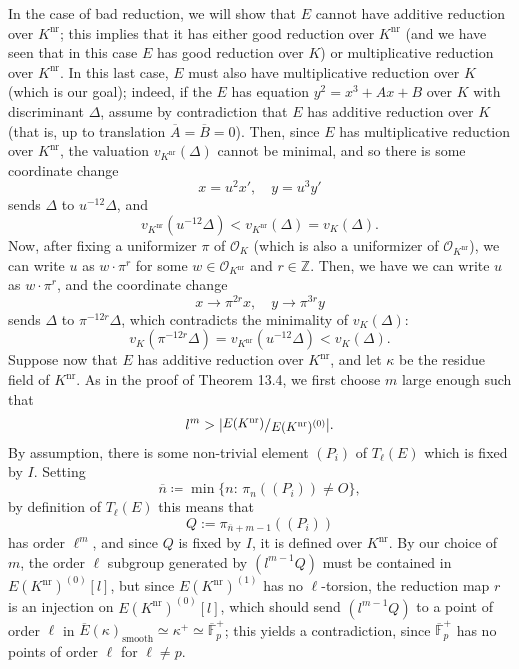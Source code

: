 \documentclass[a4paper]{article}
\newcommand{\Z}{\mathbb{Z}}
\newcommand{\Fpp}{\overline{\mathbb{F}}_p}
\newcommand{\sfrac}[2]{
        \raisebox{+0.3ex}{\scalebox{0.9}{$#1$}}
        /
        \raisebox{-0.3ex}{\scalebox{0.9}{$#2$}}
}
\theoremstyle{definition}
\theoremstyle{definition}
\theoremstyle{remark}
\theoremstyle{definition}
\begin{document}
In the case of bad reduction, we will show that $E$ cannot have additive reduction over $K^{\text{nr}}$; this implies that it has either good reduction over $K^{\text{nr}}$ (and we have seen that in
this case $E$ has good reduction over $K$) or multiplicative reduction over $K^{\text{nr}}$. In this last case, $E$ must also have multiplicative reduction over $K$ (which is our goal); indeed, if the $E$ has equation $y^2 = x^3 + Ax + B$ over $K$ with discriminant $\Delta$, assume by contradiction that $E$ has additive reduction over $K$ (that is, up to translation $\overline{A} = \overline{B} = 0$). Then, since $E$ has multiplicative reduction over $K^{\text{nr}}$, the valuation $v_{K^{\text{nr}}}(\Delta)$ cannot be minimal, and so there is some coordinate change
\[
        x = u^2 x', \quad y = u^3 y'
\]
sends $\Delta$ to $u^{-12}\Delta$, and
\[
        v_{K^{\text{nr}}}(u^{-12}\Delta) < v_{K^{\text{nr}}}(\Delta)=v_K(\Delta).
\]
Now, after fixing a uniformizer $\pi$ of
$\mathcal{O}_K$ (which is also a uniformizer of $\mathcal{O}_{K^{\text{nr}}}$), we can write $u$ as $w\cdot \pi^r$ for some $w \in \mathcal{O}_{K^{\text{nr}}}$ and $r \in \Z$. Then, we have
we can write $u$ as $w\cdot \pi^r$, and the coordinate change
\[
        x \to \pi^{2r}x, \quad y \to \pi^{3r}y
\]
sends $\Delta$ to $\pi^{-12r}\Delta$, which contradicts the minimality of $v_K(\Delta)$:
\[
        v_K(\pi^{-12r}\Delta) = v_{K^{\text{nr}}}(u^{-12}\Delta) < v_K(\Delta).
\]
Suppose now that $E$ has additive reduction over
$K^{\text{nr}}$, and let $\kappa$ be the residue field of $K^{\text{nr}}$. As in the proof of Theorem 13.4, we first choose $m$ large enough such that
$$l^m> |\sfrac{E(K^{\text{nr}})}{E(K^{\text{nr}})^{(0)}}|.$$
By assumption, there is some non-trivial element $(P_i)$ of $T_\ell(E)$ which is fixed by $I$. Setting
\[
        \overline{n}\coloneqq \min\{n:\,\pi_n((P_i))\neq O\},
\]
by definition of $T_\ell(E)$ this means that
\[Q:=\pi_{\overline{n}+m-1}((P_i))\]
has order $\ell^m$, and since $Q$ is fixed by $I$, it is defined over $K^{\text{nr}}$. By our choice of $m$, the order $\ell$ subgroup generated by $(l^{m-1}Q)$ must be contained in $E(K^{\text{nr}})^{(0)}[l]$, but since $E(K^{\text{nr}})^{(1)}$ has no $\ell$-torsion, the reduction map $r$ is an injection on $E(K^{\text{nr}})^{(0)}[l]$, which should send $(l^{m-1}Q)$ to a point of order $\ell$ in $\overline{E}(\kappa)_\text{smooth}\simeq \kappa^{+}\simeq \Fpp^{+}$; this yields a contradiction, since $\Fpp^{+}$ has no points of order $\ell$ for $\ell\neq p$.
\end{document}
